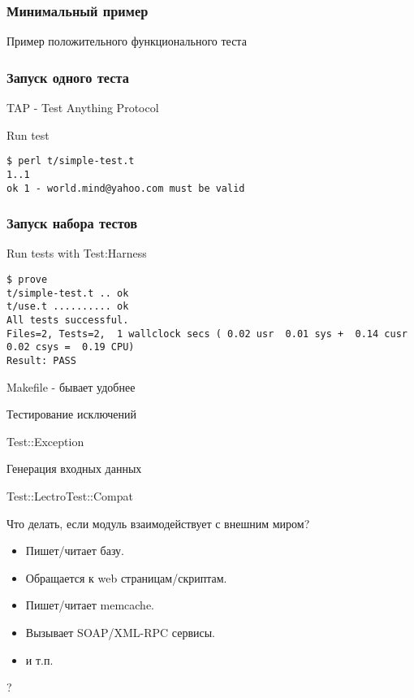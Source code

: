 \documentclass[aspectratio=169]{beamer}
\begin{document}
\begin{frame}[fragile]
\frametitle{Минимальный пример}
\begin{block}{Пример положительного функционального теста}

\end{block}
\end{frame}

\begin{frame}[fragile]
\frametitle{Запуск одного теста}
TAP - Test Anything Protocol
\begin{block}{Run test}
\begin{verbatim}
$ perl t/simple-test.t
1..1
ok 1 - world.mind@yahoo.com must be valid
\end{verbatim}
\end{block}
\end{frame}

\begin{frame}[fragile]
\frametitle{Запуск набора тестов}
\begin{block}{Run tests with Test:Harness}
\begin{verbatim}
$ prove
t/simple-test.t .. ok   
t/use.t .......... ok   
All tests successful.
Files=2, Tests=2,  1 wallclock secs ( 0.02 usr  0.01 sys +  0.14 cusr  0.02 csys =  0.19 CPU)
Result: PASS
\end{verbatim}
\end{block}
Makefile - бывает удобнее
\end{frame}

\begin{frame}{Тестирование исключений}
\begin{block}{Test::Exception}

\end{block}
\end{frame}

\begin{frame}{Генерация входных данных}
\begin{block}{Test::LectroTest::Compat}

\end{block}
\end{frame}

\begin{frame}{Что делать, если модуль взаимодействует с внешним миром?}
\begin{itemize}
\item Пишет/читает базу.
\item Обращается к web страницам/скриптам.
\item Пишет/читает memcache.
\item Вызывает SOAP/XML-RPC сервисы.
\item и т.п.
\end{itemize}
\begin{center} 
\LARGE ?
\end{center}
\end{frame}
\end{document}
